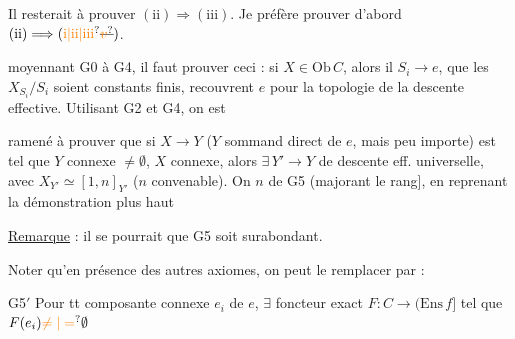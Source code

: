   

Il resterait à prouver $(\mathrm{ii})\Longrightarrow(\mathrm{iii})$. Je préfère prouver d'abord $(\mathrm{ii})\Longrightarrow(\unsure{\mathrm{i}|\mathrm{ii}|\mathrm{iii}}\deleted{\unsure{v}})$.


 moyennant G0 à G4, il faut prouver ceci : si $X\in\mathrm{Ob}\,C$, alors il   $S_i\longrightarrow e$,  que les $X_{S_i}/S_i$ soient constants finis, recouvrent $e$ pour la topologie de la descente effective. Utilisant G2 et G4, on est

       

ramené à prouver que si $X\longrightarrow Y$ ($Y$ sommand direct de $e$, mais peu importe) est tel que $Y$ connexe $\ne\emptyset$,  $X$ connexe, alors $\exists\,Y'\longrightarrow Y$ de descente eff. universelle, avec $X_{Y'}\simeq[1,n]_{Y'}$ ($n$ convenable). On   $n$ de G5 (majorant le rang], en reprenant la démonstration plus haut

\uline{Remarque} : il se pourrait que G5 soit surabondant.

Noter qu'en présence des autres axiomes, on peut le remplacer par :

G5$'$  Pour tt composante connexe $e_i$ de $e$, $\exists$ foncteur exact $F:C\longrightarrow(\mathrm{Ens}\,f]$ tel que $F(e_i)\unsure{\ne|=}\emptyset$

